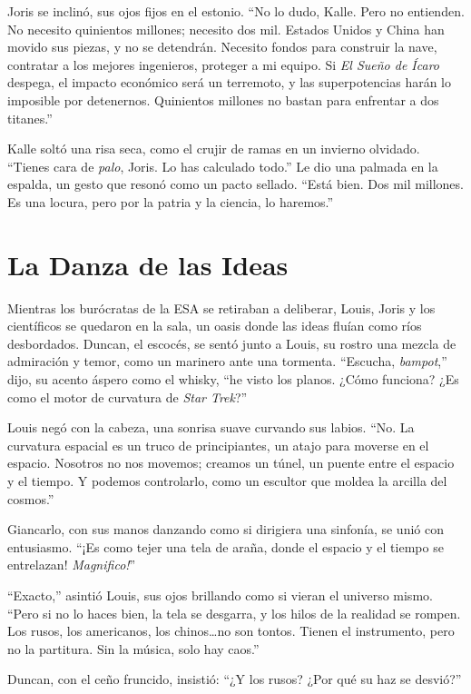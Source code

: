 Joris se inclinó, sus ojos fijos en el estonio. “No lo dudo, Kalle. Pero no entienden. No necesito quinientos millones; necesito dos mil. Estados Unidos y China han movido sus piezas, y no se detendrán. Necesito fondos para construir la nave, contratar a los mejores ingenieros, proteger a mi equipo. Si \emph{El Sueño de Ícaro} despega, el impacto económico será un terremoto, y las superpotencias harán lo imposible por detenernos. Quinientos millones no bastan para enfrentar a dos titanes.”

Kalle soltó una risa seca, como el crujir de ramas en un invierno olvidado. “Tienes cara de \emph{palo}, Joris. Lo has calculado todo.” Le dio una palmada en la espalda, un gesto que resonó como un pacto sellado. “Está bien. Dos mil millones. Es una locura, pero por la patria y la ciencia, lo haremos.”

\section{La Danza de las Ideas}
\label{sec:danza-ideas}

Mientras los burócratas de la ESA se retiraban a deliberar, Louis, Joris y los científicos se quedaron en la sala, un oasis donde las ideas fluían como ríos desbordados. Duncan, el escocés, se sentó junto a Louis, su rostro una mezcla de admiración y temor, como un marinero ante una tormenta. “Escucha, \emph{bampot},” dijo, su acento áspero como el whisky, “he visto los planos. ¿Cómo funciona? ¿Es como el motor de curvatura de \emph{Star Trek}?”

Louis negó con la cabeza, una sonrisa suave curvando sus labios. “No. La curvatura espacial es un truco de principiantes, un atajo para moverse en el espacio. Nosotros no nos movemos; creamos un túnel, un puente entre el espacio y el tiempo. Y podemos controlarlo, como un escultor que moldea la arcilla del cosmos.”

Giancarlo, con sus manos danzando como si dirigiera una sinfonía, se unió con entusiasmo. “¡Es como tejer una tela de araña, donde el espacio y el tiempo se entrelazan! \emph{Magnifico!}”

“Exacto,” asintió Louis, sus ojos brillando como si vieran el universo mismo. “Pero si no lo haces bien, la tela se desgarra, y los hilos de la realidad se rompen. Los rusos, los americanos, los chinos\dots no son tontos. Tienen el instrumento, pero no la partitura. Sin la música, solo hay caos.”

Duncan, con el ceño fruncido, insistió: “¿Y los rusos? ¿Por qué su haz se desvió?”

